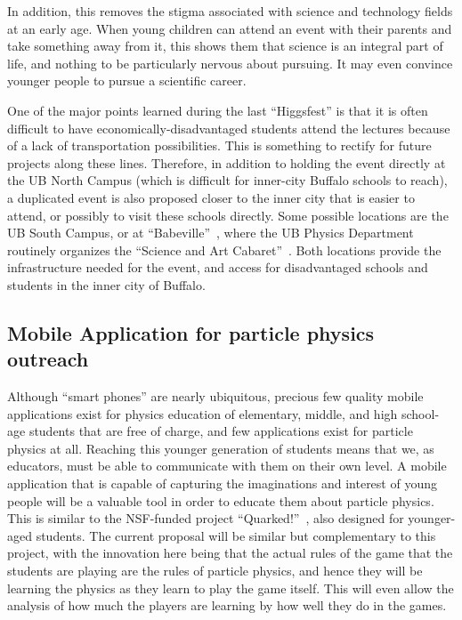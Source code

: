\documentclass[12pt]{proposalnsf}
\begin{document}
In addition, this removes the stigma associated with science and
technology fields at an early age. When young children can attend an
event with their parents and take something away from it, this shows
them that science is an integral part of life, and nothing to be
particularly nervous about pursuing. It may even convince younger
people to pursue a scientific career. 

One of the major points learned during the last ``Higgsfest''
is that it is often difficult to have economically-disadvantaged
students attend the lectures because of a lack of transportation
possibilities. This is something to rectify for future
projects along these lines. Therefore, in addition to holding the
event directly
at the UB North Campus (which is difficult for inner-city
Buffalo schools to reach), a duplicated event is also proposed
closer to the inner city that is easier to attend, or possibly to
visit these schools directly. Some possible
locations are the UB South Campus, or at
``Babeville''~\cite{babeville}, where the UB Physics
Department routinely organizes the ``Science and Art
Cabaret''~\cite{cabaret}. Both locations 
provide the infrastructure needed for the event, and
access for disadvantaged schools and students in the inner city of
Buffalo. 



\subsection{Mobile Application for particle physics outreach}

Although ``smart phones'' are nearly ubiquitous, precious few
quality mobile applications exist for physics education of elementary,
middle, and high school-age students that are free of charge, and few
applications exist for particle physics at all. Reaching this younger
generation of students means
that we, as educators, must be able to communicate with them on their
own level. A mobile application that is capable of capturing the
imaginations and interest of young people will be a valuable tool in
order to educate them about particle physics. This is similar to the
NSF-funded project ``Quarked!''~\cite{quarked},
also designed for younger-aged students. The current proposal will be
similar but complementary to this project, with the innovation here
being that the actual rules of the game that the students are playing
are the rules of particle physics, and hence they will be learning the
physics as they learn to play the game itself. This will even allow
the analysis of how much the players are learning by how well they do
in the games. 
\end{document}
